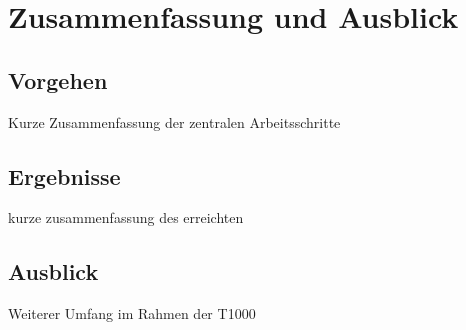 
\chapter{Zusammenfassung und Ausblick}
\section{Vorgehen}
Kurze Zusammenfassung der zentralen Arbeitsschritte

\section{Ergebnisse}
kurze zusammenfassung des erreichten

\section{Ausblick}
Weiterer Umfang im Rahmen der T1000